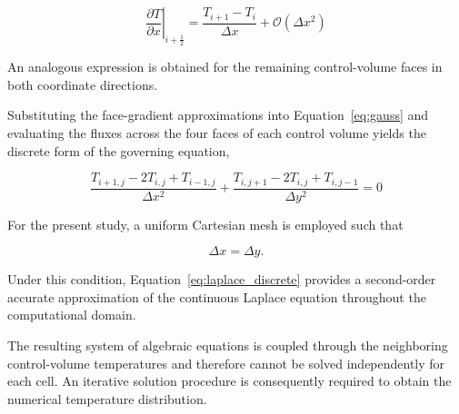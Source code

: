 \begin{equation}
\left.\frac{\partial T}{\partial x}\right|_{i+\frac12}
=
\frac{T_{i+1}-T_i}{\Delta x}
+
\mathcal{O}(\Delta x^2)
\label{eq:face_gradient}
\end{equation}

An analogous expression is obtained for the remaining control-volume faces in both coordinate directions.

Substituting the face-gradient approximations into Equation~\ref{eq:gauss} and evaluating the fluxes across the four faces of each control volume yields the discrete form of the governing equation,

\begin{equation}
\frac{T_{i+1,j}-2T_{i,j}+T_{i-1,j}}{\Delta x^2}
+
\frac{T_{i,j+1}-2T_{i,j}+T_{i,j-1}}{\Delta y^2}
=
0
\label{eq:laplace_discrete}
\end{equation}

For the present study, a uniform Cartesian mesh is employed such that

\[
\Delta x=\Delta y.
\]

Under this condition, Equation~\ref{eq:laplace_discrete} provides a second-order accurate approximation of the continuous Laplace equation throughout the computational domain.

The resulting system of algebraic equations is coupled through the neighboring control-volume temperatures and therefore cannot be solved independently for each cell. An iterative solution procedure is consequently required to obtain the numerical temperature distribution.

